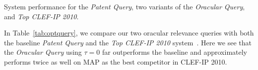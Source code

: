 \begin{table}[t!]
  \begin{center}
   \caption{System performance for the {\em Patent Query}, two variants of the {\em Oracular Query}, and {\em Top CLEF-IP 2010}.}
   \vspace*{1ex}
     
  \label{tab:optquery}
  \end{center}  
\end{table}

In Table~\ref{tab:optquery}, we compare our two oracular relevance
queries with both the baseline \emph{Patent Query} and the \emph{Top
CLEF-IP 2010} system~\cite{lopez2010experiments}.  Here we see that
the {\em Oracular Query} using $\tau=0$ far outperforms the baseline and
approximately performs twice as well on MAP as the best competitor in
CLEF-IP 2010.

%
%


